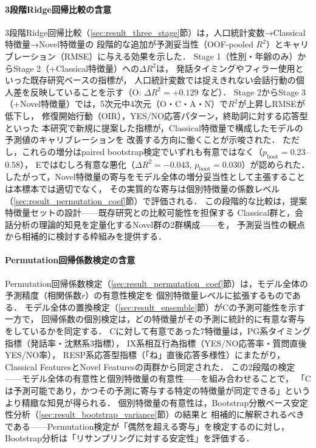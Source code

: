 \documentclass[dvipdfmx,11pt,a4paper]{bxjsarticle}
\begin{document}
\paragraph{3段階Ridge回帰比較の含意}
3段階Ridge回帰比較（\ref{sec:result_three_stage}節）は，人口統計変数→Classical特徴量→Novel特徴量の
段階的な追加が予測妥当性（OOF-pooled $R^2$）とキャリブレーション（RMSE）に与える効果を示した．
Stage 1（性別・年齢のみ）からStage 2（+Classical特徴量）への$\Delta R^2$は，
発話タイミングやフィラー使用といった既存研究ベースの指標が，
人口統計変数では捉えきれない会話行動の個人差を反映していることを示す（O: $\Delta R^2 = +0.129$ など）．
Stage 2からStage 3（+Novel特徴量）では，5次元中4次元（O・C・A・N）で$R^2$が上昇しRMSEが低下し，
修復開始行動（OIR），YES/NO応答パターン，終助詞に対する応答型といった
本研究で新規に提案した指標が，Classical特徴量で構成したモデルの予測値のキャリブレーションを
改善する方向に働くことが示唆された．
ただし，これらの増分はpaired bootstrap検定でいずれも有意ではなく（$p_{\text{boot}} = 0.23$--$0.58$），
Eではむしろ有意な悪化（$\Delta R^2 = -0.043$, $p_{\text{boot}} = 0.030$）が認められた．
したがって，Novel特徴量の寄与をモデル全体の増分妥当性として主張することは本標本では適切でなく，
その実質的な寄与は個別特徴量の係数レベル（\ref{sec:result_permutation_coef}節）で評価される．
この段階的な比較は，提案特徴量セットの設計——既存研究との比較可能性を担保する
Classical群と，会話分析の理論的知見を定量化するNovel群の2群構成——を，
予測妥当性の観点から相補的に検討する枠組みを提供する．

\paragraph{Permutation回帰係数検定の含意}
Permutation回帰係数検定（\ref{sec:result_permutation_coef}節）は，モデル全体の予測精度（相関係数$r$）の有意性検定を
個別特徴量レベルに拡張するものである．
モデル全体の置換検定（\ref{sec:result_ensemble}節）がCの予測可能性を示す一方で，
回帰係数の個別検定は，どの特徴量がその予測に統計的に有意な寄与をしているかを同定する．
Cに対して有意であった7特徴量は，PG系タイミング指標（発話率・沈黙系3指標），
IX系相互行為指標（YES/NO応答率・質問直後YES/NO率），
RESP系応答型指標（「ね」直後応答多様性）にまたがり，
Classical FeaturesとNovel Featuresの両群から同定された．
この2段階の検定——モデル全体の有意性と個別特徴量の有意性——を組み合わせることで，
「Cは予測可能であり，かつその予測に寄与する特定の特徴量が同定できる」という
より精緻な知見が得られる．
個別特徴量の有意性は，Bootstrap分散ベース安定性分析（\ref{sec:result_bootstrap_variance}節）の結果と
相補的に解釈されるべきである——Permutation検定が「偶然を超える寄与」を検定するのに対し，
Bootstrap分析は「リサンプリングに対する安定性」を評価する．
\end{document}
